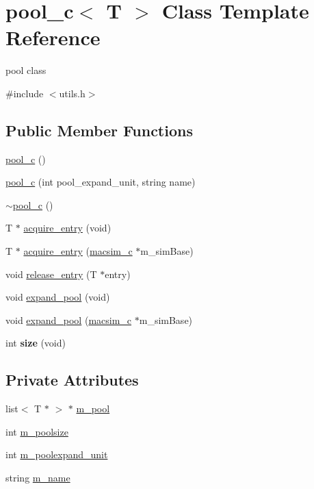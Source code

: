 \hypertarget{classpool__c}{
\section{pool\_\-c$<$ T $>$ Class Template Reference}
\label{classpool__c}
}


pool class  




{\ttfamily \#include $<$utils.h$>$}

\subsection*{Public Member Functions}
\begin{DoxyCompactItemize}
\item 
\hyperlink{classpool__c_ae046e396e7ac770f08794f37af913baf}{pool\_\-c} ()
\item 
\hyperlink{classpool__c_a27cca5145487122c44e63312edb95e40}{pool\_\-c} (int pool\_\-expand\_\-unit, string name)
\item 
\hyperlink{classpool__c_a398d3ecde03402f50fc02a0b04ae18e4}{$\sim$pool\_\-c} ()
\item 
T $\ast$ \hyperlink{classpool__c_a71f6e723ae8fef36d79ad5635edd2411}{acquire\_\-entry} (void)
\item 
T $\ast$ \hyperlink{classpool__c_abc21d62ac4f9d941fbe211d0decd5f7e}{acquire\_\-entry} (\hyperlink{classmacsim__c}{macsim\_\-c} $\ast$m\_\-simBase)
\item 
void \hyperlink{classpool__c_ac407b5245c7977b5baa5087ecbb395f2}{release\_\-entry} (T $\ast$entry)
\item 
void \hyperlink{classpool__c_a5bf9f2ef7e204b5f42feebf5394d00b7}{expand\_\-pool} (void)
\item 
void \hyperlink{classpool__c_a30c82c339cab1f22f427dc4189ebea66}{expand\_\-pool} (\hyperlink{classmacsim__c}{macsim\_\-c} $\ast$m\_\-simBase)
\item 
\hypertarget{classpool__c_a0589bbfc3b435c81cf4cd789a5fef668}{
int {\bfseries size} (void)}
\label{classpool__c_a0589bbfc3b435c81cf4cd789a5fef668}

\end{DoxyCompactItemize}
\subsection*{Private Attributes}
\begin{DoxyCompactItemize}
\item 
list$<$ T $\ast$ $>$ $\ast$ \hyperlink{classpool__c_ad882da850ef2313b4f2fb6c34ef3d760}{m\_\-pool}
\item 
int \hyperlink{classpool__c_aa20a955bf65ee7898e1028a76384c7bc}{m\_\-poolsize}
\item 
int \hyperlink{classpool__c_a439d24816449390c4b7ff8b9cac84faf}{m\_\-poolexpand\_\-unit}
\item 
string \hyperlink{classpool__c_a38ccabc9cf0fe92037e915485f02bf98}{m\_\-name}
\end{DoxyCompactItemize}


